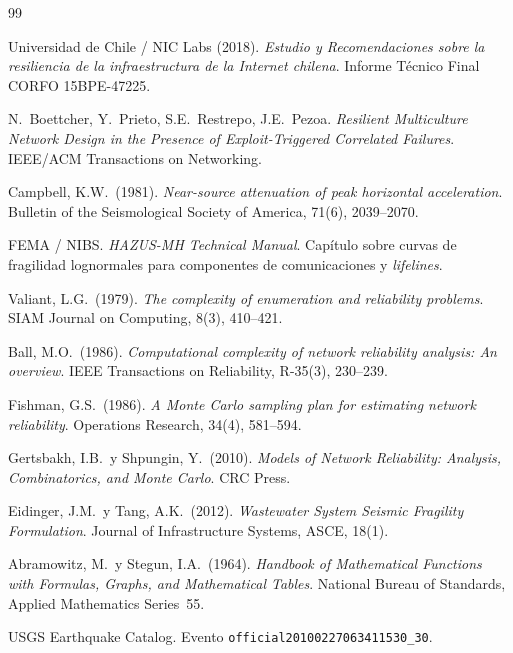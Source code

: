 \documentclass[12pt,a4paper]{article}
\begin{document}
\begin{thebibliography}{99}

Universidad de Chile / NIC Labs (2018).
\emph{Estudio y Recomendaciones sobre la resiliencia de la infraestructura
de la Internet chilena}.
Informe Técnico Final CORFO 15BPE-47225.

N.\ Boettcher, Y.\ Prieto, S.E.\ Restrepo, J.E.\ Pezoa.
\emph{Resilient Multiculture Network Design in the Presence of
Exploit-Triggered Correlated Failures}.
IEEE/ACM Transactions on Networking.

Campbell, K.W.\ (1981).
\emph{Near-source attenuation of peak horizontal acceleration}.
Bulletin of the Seismological Society of America, 71(6), 2039--2070.

FEMA / NIBS.
\emph{HAZUS-MH Technical Manual}.
Capítulo sobre curvas de fragilidad lognormales para componentes de
comunicaciones y \textit{lifelines}.

Valiant, L.G.\ (1979).
\emph{The complexity of enumeration and reliability problems}.
SIAM Journal on Computing, 8(3), 410--421.

Ball, M.O.\ (1986).
\emph{Computational complexity of network reliability analysis: An overview}.
IEEE Transactions on Reliability, R-35(3), 230--239.

Fishman, G.S.\ (1986).
\emph{A Monte Carlo sampling plan for estimating network reliability}.
Operations Research, 34(4), 581--594.

Gertsbakh, I.B.\ y Shpungin, Y.\ (2010).
\emph{Models of Network Reliability: Analysis, Combinatorics, and Monte
Carlo}.
CRC Press.

Eidinger, J.M.\ y Tang, A.K.\ (2012).
\emph{Wastewater System Seismic Fragility Formulation}.
Journal of Infrastructure Systems, ASCE, 18(1).

Abramowitz, M.\ y Stegun, I.A.\ (1964).
\emph{Handbook of Mathematical Functions with Formulas, Graphs, and
Mathematical Tables}.
National Bureau of Standards, Applied Mathematics Series~55.

USGS Earthquake Catalog.
Evento \texttt{official20100227063411530\_30}.

\end{thebibliography}
\end{document}
